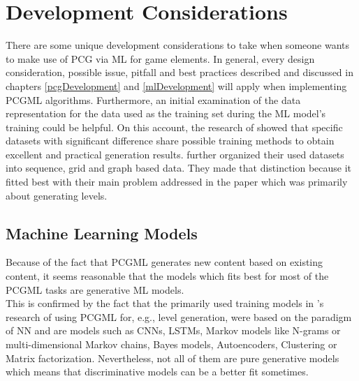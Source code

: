 \documentclass[MGS,Master,english]{twbook}%
\begin{document}
\section{Development Considerations} \label{PCGML::devConsiderations}
There are some unique development considerations to take when someone wants to make use of PCG via ML for game elements. In general, every design consideration, possible issue, pitfall and best practices described and discussed in chapters \ref{pcgDevelopment} and \ref{mlDevelopment} will apply when implementing PCGML algorithms. Furthermore, an initial examination of the data representation for the data used as the training set during the ML model’s training could be helpful. On this account, the research of \citep{pcgml::paper} showed that specific datasets with significant difference share possible training methods to obtain excellent and practical generation results. \citep{pcgml::paper} further organized their used datasets into sequence, grid and graph based data. They made that distinction because it fitted best with their main problem addressed in the paper which was primarily about generating levels.

\subsection{Machine Learning Models}
Because of the fact that PCGML generates new content based on existing content, it seems reasonable that the models which fits best for most of the PCGML tasks are generative ML models.\\
This is confirmed by the fact that the primarily used training models in 's research of using PCGML for, e.g., level generation, were based on the paradigm of \ac{NN} and are models such as \acp{CNN}, \acp{LSTM}, Markov models like N-grams or multi-dimensional Markov chains, Bayes models, Autoencoders, Clustering or Matrix factorization. Nevertheless, not all of them are pure generative models which means that discriminative models can be a better fit sometimes.
\end{document}
